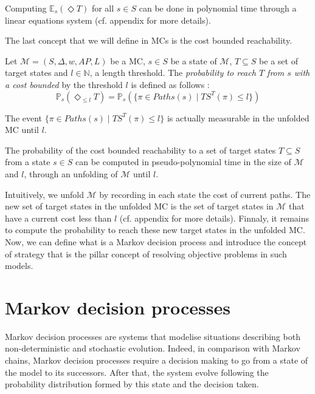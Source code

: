 \begin{theorem}
  Computing $\mathbb{E}_s(\Diamond T)$ for all $s \in S$ can be done in polynomial time through a linear equations system (cf. appendix for more details).
\end{theorem}

The last concept that we will define in MCs is the cost bounded reachability.

\begin{definition}
	Let $\mathcal{M} = (S, \Delta, w, AP, L)$ be a MC, $s \in S$ be a state of $\mathcal{M}$, $T \subseteq S$ be a set of target states and $l \in \mathbb{N}$, a length threshold.
  The \textit{probability to reach $T$ from $s$ with a cost bounded} by the threshold $l$ is defined as follows :
	\[
    \mathbb{P}_s(\Diamond_{\leq l} T) = \mathbb{P}_s(\{\pi \in Paths(s) \; | \; TS^T(\pi) \leq l \})
  \]
\end{definition}
The event $\{\pi \in Paths(s) \; | \; TS^T(\pi) \leq l \}$ is actually measurable
in the unfolded MC until $l$.
\begin{theorem}
  The probability of the cost bounded reachability to a set of target states $T \subseteq S$ from a state $s \in S$ can be computed in pseudo-polynomial time in the size of $\mathcal{M}$ and $l$, through an unfolding of $\mathcal{M}$ until $l$.
\end{theorem}

Intuitively, we unfold $\mathcal{M}$ by recording in each state the cost of
current paths. The new set of target states in the unfolded MC is the set of
target states in $\mathcal{M}$ that have a current cost less than $l$ (cf.
appendix for more details). Finnaly, it remains to compute the probability to
reach these new target states in the unfolded MC. \\

Now, we can define what is a Markov decision process and introduce the concept of strategy that is the pillar concept of resolving objective problems in such models.

\section{Markov decision processes}
Markov decision processes are systems that modelise situations describing both non-deterministic and stochastic evolution. Indeed, in comparison with Markov chains, Markov decision processes require a decision making to go from a state of the model to its successors. After that, the system evolve following the probability distribution formed by this state and the decision taken.

